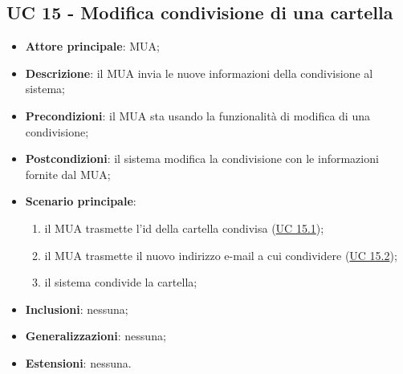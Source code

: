 \subsection{UC 15 - Modifica condivisione di una cartella} \label{sec:UC15}

    \begin{itemize}
        \item \textbf{Attore principale}: MUA;
        \item \textbf{Descrizione}: il MUA invia le nuove informazioni della condivisione al sistema;
        \item \textbf{Precondizioni}: il MUA sta usando la funzionalità di modifica di una condivisione;
        \item \textbf{Postcondizioni}: il sistema modifica la condivisione con le informazioni fornite dal MUA;
        \item \textbf{Scenario principale}:
            \begin{enumerate}
                \item il MUA trasmette l'id della cartella condivisa (\hyperref[sec:UC15.1]{UC 15.1});
                \item il MUA trasmette il nuovo indirizzo e-mail a cui condividere (\hyperref[sec:UC15.2]{UC 15.2});
                \item il sistema condivide la cartella;
            \end{enumerate}
        \item \textbf{Inclusioni}: nessuna;
        \item \textbf{Generalizzazioni}: nessuna;
        \item \textbf{Estensioni}: nessuna.
    \end{itemize}

